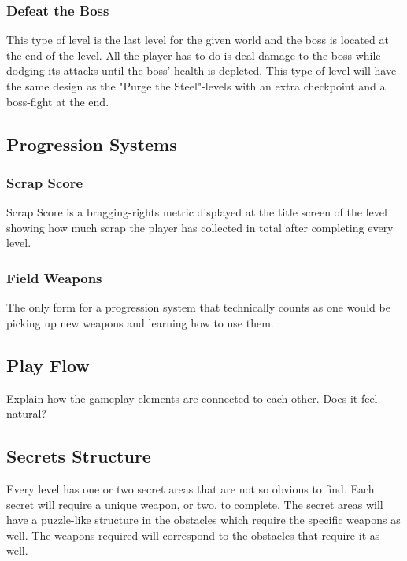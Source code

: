 \documentclass[12pt]{article}
\begin{document}
\subsubsection{Defeat the Boss}

This type of level is the last level for the given world and the boss is located at the end of the level. All the player has to do is deal damage to the boss while dodging its attacks until the boss' health is depleted. This type of level will have the same design as the "Purge the Steel"-levels with an extra checkpoint and a boss-fight at the end. 

\subsection{Progression Systems}

\subsubsection{Scrap Score}

Scrap Score is a bragging-rights metric displayed at the title screen of the level showing how much scrap the player has collected in total after completing every level. 

\subsubsection{Field Weapons}

The only form for a progression system that technically counts as one would be picking up new weapons and learning how to use them. 

\subsection{Play Flow}

Explain how the gameplay elements are connected to each other. Does it feel natural?

\subsection{Secrets Structure}

Every level has one or two secret areas that are not so obvious to find. Each secret will require a unique weapon, or two, to complete. The secret areas will have a puzzle-like structure in the obstacles which require the specific weapons as well. The weapons required will correspond to the obstacles that require it as well. 
\end{document}
